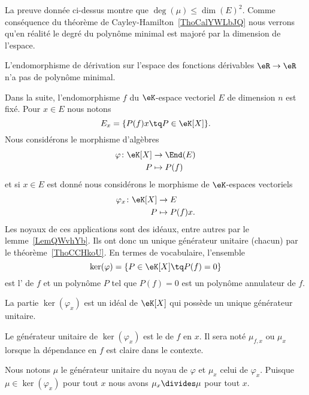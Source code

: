 \begin{remark}
    La preuve donnée ci-dessus montre que \( \deg(\mu)\leq \dim(E)^2\). Comme conséquence du théorème de Cayley-Hamilton~\ref{ThoCalYWLbJQ} nous verrons qu'en réalité le degré du polynôme minimal est majoré par la dimension de l'espace.
\end{remark}

\begin{proposition}        \label{PROPooZCUSooLUUrxi}
    L'endomorphisme de dérivation sur l'espace des fonctions dérivables \( \eR\to \eR\) n'a pas de polynôme minimal.
\end{proposition}

Dans la suite, l'endomorphisme \( f\) du \( \eK\)-espace vectoriel \( E\) de dimension \( n\) est fixé. Pour \( x\in E\) nous notons
\begin{equation}            \label{EqooOAYDooEpZELo}
    E_x=\{ P(f)x\tq P\in \eK[X] \}.
\end{equation}
Nous considérons le morphisme d'algèbres
\begin{equation}
    \begin{aligned}
        \varphi\colon \eK[X]&\to \End(E) \\
        P&\mapsto P(f)
    \end{aligned}
\end{equation}
et si \( x\in E\) est donné nous considérons le morphisme de \( \eK\)-espaces vectoriels
\begin{equation}
    \begin{aligned}
        \varphi_x\colon \eK[X]&\to E \\
        P&\mapsto P(f)x.
    \end{aligned}
\end{equation}
Les noyaux de ces applications sont des idéaux, entre autres par le lemme~\ref{LemQWvhYb}. Ils ont donc un unique générateur unitaire (chacun) par le théorème~\ref{ThoCCHkoU}. En termes de vocabulaire, l'ensemble
\begin{equation}
    \ker(\varphi)=\{  P\in\eK[X]\tq P(f)=0  \}
\end{equation}
est l' de \( f\) et un polynôme \( P\) tel que \( P(f)=0\) est un polynôme annulateur de \( f\).

\begin{propositionDef}      \label{DEFooUICRooBGYhqQ}
    La partie \( \ker(\varphi_x)\) est un idéal de \( \eK[X]\) qui possède un unique générateur unitaire.

    Le générateur unitaire de \( \ker(\varphi_x)\) est le  de \( f\) en \( x\). Il sera noté \( \mu_{f,x}\) ou \( \mu_x\) lorsque la dépendance en \( f\) est claire dans le contexte.
\end{propositionDef}
Nous notons \( \mu\) le générateur unitaire du noyau de \( \varphi\) et \( \mu_x\) celui de \( \varphi_x\). Puisque \( \mu\in\ker(\varphi_x)\) pour tout \( x\) nous avons \( \mu_x\divides \mu\) pour tout \( x\).

